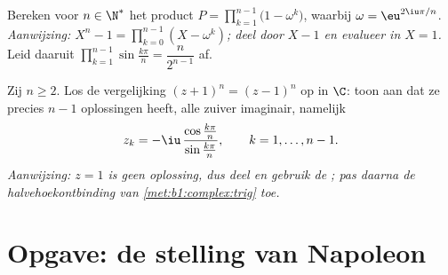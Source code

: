 \begin{exercise}[$\star\star\star$]\label{exo:b1:complex:11}
Bereken voor $n \in \N^*$ het product $P = \prod_{k=1}^{n-1}
\bigl(1 - \omega^k\bigr)$, waarbij $\omega = \eu^{2\iu\pi/n}$.
\emph{Aanwijzing: $X^n - 1 = \prod_{k=0}^{n-1} (X - \omega^k)$; deel
door $X - 1$ en evalueer in $X = 1$.} Leid daaruit
$\prod_{k=1}^{n-1} \sin\frac{k\pi}{n} = \dfrac{n}{2^{n-1}}$ af.
\end{exercise}

\begin{exercise}[$\star\star$]\label{exo:b1:complex:12}
Zij $n \geq 2$. Los de vergelijking $(z + 1)^n = (z - 1)^n$ op in $\C$:
toon aan dat ze precies $n - 1$ oplossingen heeft, alle zuiver
imaginair, namelijk
\[
z_k = -\iu\,\frac{\cos\frac{k\pi}{n}}{\sin\frac{k\pi}{n}},
\qquad k = 1, \dots, n - 1 .
\]
\emph{Aanwijzing: $z = 1$ is geen oplossing, dus deel en gebruik de
; pas daarna de halvehoekontbinding van
\cref{met:b1:complex:trig} toe.}
\end{exercise}

\section{Opgave: de stelling van Napoleon}

